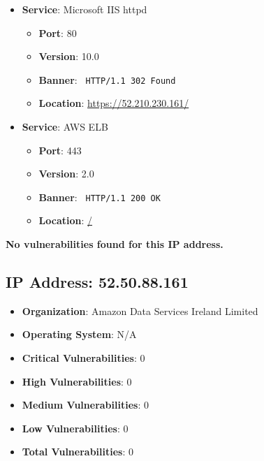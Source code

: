 \documentclass{article}
\begin{document}
\begin{itemize}
    
        \item \textbf{Service}: Microsoft IIS httpd
        \begin{itemize}
            \item \textbf{Port}: 80
            \item \textbf{Version}:  10.0 
            \item \textbf{Banner}: \texttt{ HTTP/1.1 302 Found
 }
            \item \textbf{Location}: \href{ https://52.210.230.161/ }{ https://52.210.230.161/ }
        \end{itemize}
    
        \item \textbf{Service}: AWS ELB
        \begin{itemize}
            \item \textbf{Port}: 443
            \item \textbf{Version}:  2.0 
            \item \textbf{Banner}: \texttt{ HTTP/1.1 200 OK
 }
            \item \textbf{Location}: \href{ / }{ / }
        \end{itemize}
    
\end{itemize}


\textbf{No vulnerabilities found for this IP address.}


\clearpage



\subsection*{IP Address: 52.50.88.161}

\begin{itemize}
    \item \textbf{Organization}: Amazon Data Services Ireland Limited
    \item \textbf{Operating System}:  N/A 
    \item \textbf{Critical Vulnerabilities}: 0
    \item \textbf{High Vulnerabilities}: 0
    \item \textbf{Medium Vulnerabilities}: 0
    \item \textbf{Low Vulnerabilities}: 0
    \item \textbf{Total Vulnerabilities}: 0
\end{itemize}
\end{document}
